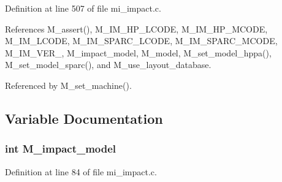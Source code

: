 Definition at line 507 of file mi\_\-impact.c.

References M\_\-assert(), M\_\-IM\_\-HP\_\-LCODE, M\_\-IM\_\-HP\_\-MCODE, M\_\-IM\_\-LCODE, M\_\-IM\_\-SPARC\_\-LCODE, M\_\-IM\_\-SPARC\_\-MCODE, M\_\-IM\_\-VER\_, M\_\-impact\_\-model, M\_\-model, M\_\-set\_\-model\_\-hppa(), M\_\-set\_\-model\_\-sparc(), and M\_\-use\_\-layout\_\-database.

Referenced by M\_\-set\_\-machine().

\subsection{Variable Documentation}
\subsubsection{\setlength{\rightskip}{0pt plus 5cm}int \bf{M\_\-impact\_\-model}}\label{mi__impact_8c_6bc09fd2e80115fe0235158cc800ead0}




Definition at line 84 of file mi\_\-impact.c.